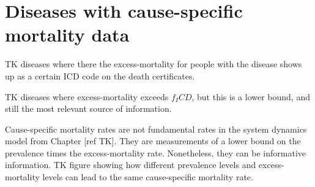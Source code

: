 \section{Diseases with cause-specific mortality data}

TK diseases where there the excess-mortality for people with the
disease shows up as a certain ICD code on the death certificates.

TK diseases where excess-mortality exceeds $f_ICD$, but this is a lower
bound, and still the most relevant source of information.

Cause-specific mortality rates are not fundamental rates in the system
dynamics model from Chapter [ref TK]. They are measurements of a lower
bound on the prevalence times the excess-mortality rate. Nonetheless,
they can be informative information. TK figure showing how different
prevalence levels and excess-mortality levels can lead to the same
cause-specific mortality rate.
